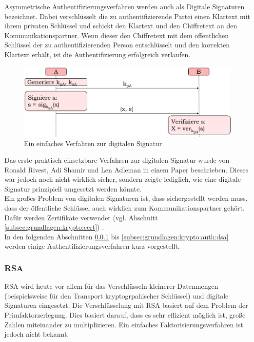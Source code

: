 			Asymmetrische Authentifizierungsverfahren werden auch als Digitale Signaturen bezeichnet. Dabei verschlüsselt die zu authentifizierende Partei einen Klartext mit ihrem privaten Schlüssel und schickt den Klartext und den Chiffretext an den Kommunikationspartner. Wenn dieser den Chiffretext mit dem öffentlichen Schlüssel der zu authentifizierenden Person entschlüsselt und den korrekten Klartext erhält, ist die Authentifizierung erfolgreich verlaufen.\\
			
			\begin{figure}[htbp]
				\centering
				\includegraphics[width=\textwidth]{chapters/abb/grundlagen-sig}
				\caption{Ein einfaches Verfahren zur digitalen Signatur}
				\label{fig:grundlagen:sig}
			\end{figure}
			
			Das erste praktisch einsetzbare Verfahren zur digitalen Signatur wurde von Ronald Rivest, Adi Shamir und Len Adleman in einem Paper beschrieben. Dieses war jedoch noch nicht wirklich sicher, sondern zeigte lediglich, wie eine digitale Signatur prinzipiell umgesetzt werden könnte.\\
			
			Ein großes Problem von digitalen Signaturen ist, dass sichergestellt werden muss, dass der öffentliche Schlüssel auch wirklich zum Kommunikationspartner gehört. Dafür werden Zertifikate verwendet (vgl. Abschnitt \ref{subsec:grundlagen:krypto:cert}) \cite{Paar2010-E}.\\
			
			In den folgenden Abschnitten \ref{subsubsec:grundlagen:krypto:auth:rsa} bis \ref{subsec:grundlagen:krypto:auth:dsa} werden einige Authentifizierungsverfahren kurz vorgestellt.
			
			\subsubsection{RSA}
			\label{subsubsec:grundlagen:krypto:auth:rsa}
			
			RSA wird heute vor allem für das Verschlüsseln kleinerer Datenmengen (beispielsweise für den Transport kryptogrpahischer Schlüssel) und digitale Signaturen eingesetzt. Die Verschlüsselung mit RSA basiert auf dem Problem der Primfaktorzerlegung. Dies basiert darauf, dass es sehr effizient möglich ist, große Zahlen miteinander zu multiplizieren. Ein einfaches Faktorisierungsverfahren ist jedoch nicht bekannt.\\
			
